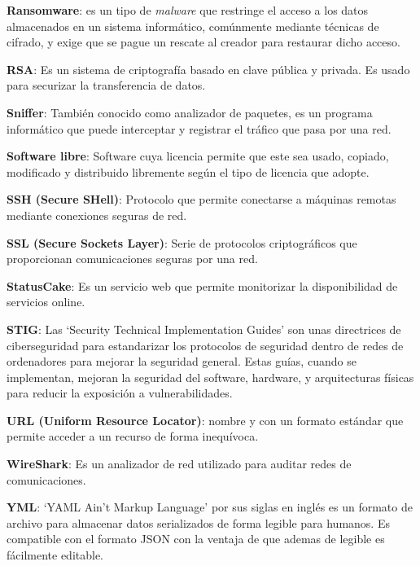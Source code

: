 \textbf{Ransomware}: es un tipo de \textit{malware} que restringe el acceso a los datos almacenados en un sistema informático, comúnmente mediante técnicas de cifrado, y exige que se pague un rescate al creador para restaurar dicho acceso.
\bigskip

\textbf{RSA}: Es un sistema de criptografía basado en clave pública y privada. Es usado para securizar la transferencia de datos.
\bigskip

\textbf{Sniffer}: También conocido como analizador de paquetes, es un programa informático que puede interceptar y registrar el tráfico que pasa por una red.
\bigskip

\textbf{Software libre}: Software cuya licencia permite que este sea usado, copiado, modificado y distribuido libremente según el tipo de licencia que adopte.
\bigskip

\textbf{SSH (Secure SHell)}: Protocolo que permite conectarse a máquinas remotas mediante conexiones seguras de red.
\bigskip

\textbf{SSL (Secure Sockets Layer)}: Serie de protocolos criptográficos que proporcionan comunicaciones seguras por una red.
\bigskip

\textbf{StatusCake}: Es un servicio web que permite monitorizar la disponibilidad de servicios online.
\bigskip

\textbf{STIG}: Las `Security Technical Implementation Guides' son unas directrices de ciberseguridad para estandarizar los protocolos de seguridad dentro de redes de ordenadores para mejorar la seguridad general. Estas guías, cuando se implementan, mejoran la seguridad del software, hardware,
y arquitecturas físicas para reducir la exposición a vulnerabilidades.
\bigskip

\textbf{URL (Uniform Resource Locator)}: nombre y con un formato estándar que permite acceder a un recurso de forma inequívoca.
\bigskip

\textbf{WireShark}: Es un analizador de red utilizado para auditar redes de comunicaciones.
\bigskip

\textbf{YML}: `YAML Ain't Markup Language' por sus siglas en inglés es un formato de archivo para almacenar datos serializados de forma legible para humanos. Es compatible con el formato JSON con la ventaja de que ademas de legible es fácilmente editable.
